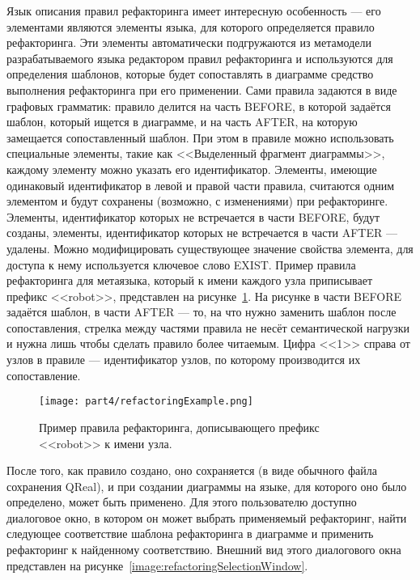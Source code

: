 Язык описания правил рефакторинга имеет интересную особенность --- его элементами 
являются элементы языка, для которого определяется правило рефакторинга. Эти элементы 
автоматически подгружаются из метамодели разрабатываемого языка редактором правил 
рефакторинга и используются для определения шаблонов, которые будет сопоставлять в 
диаграмме средство выполнения рефакторинга при его применении. Сами правила задаются 
в виде графовых грамматик: правило делится на часть BEFORE, в которой задаётся шаблон, 
который ищется в диаграмме, и на часть AFTER, на которую замещается сопоставленный 
шаблон. При этом в правиле можно использовать специальные элементы, такие как <<Выделенный 
фрагмент диаграммы>>, каждому элементу можно указать его идентификатор. Элементы, 
имеющие одинаковый идентификатор в левой и правой части правила, считаются одним элементом 
и будут сохранены (возможно, с изменениями) при рефакторинге. Элементы, идентификатор 
которых не встречается в части BEFORE, будут созданы, элементы, идентификатор которых 
не встречается в части AFTER --- удалены. Можно модифицировать существующее значение 
свойства элемента, для доступа к нему используется ключевое слово EXIST. Пример правила 
рефакторинга для метаязыка, который к имени каждого узла приписывает префикс <<robot>>, 
представлен на рисунке~\ref{image:refactoringExample}. На рисунке в части BEFORE задаётся шаблон, в части 
AFTER --- то, на что нужно заменить шаблон после сопоставления, стрелка между частями 
правила не несёт семантической нагрузки и нужна лишь чтобы сделать правило более читаемым. 
Цифра <<1>> справа от узлов в правиле --- идентификатор узлов, по которому производится 
их сопоставление.

\begin{figure} [ht]
	\begin{center}
		\texttt{[image: part4/refactoringExample.png]}
		\caption{Пример правила рефакторинга, дописывающего префикс <<robot>> к имени узла.}
		\label{image:refactoringExample}
	\end{center}
\end{figure}

После того, как правило создано, оно сохраняется (в виде обычного файла сохранения QReal), 
и при создании диаграммы на языке, для которого оно было определено, может быть применено. 
Для этого пользователю доступно диалоговое окно, в котором он может выбрать применяемый 
рефакторинг, найти следующее соответствие шаблона рефакторинга в диаграмме и применить 
рефакторинг к найденному соответствию. Внешний вид этого диалогового окна представлен 
на рисунке~\ref{image:refactoringSelectionWindow}.

